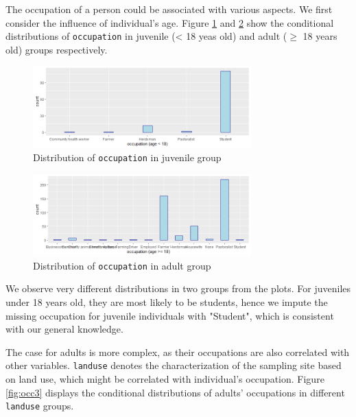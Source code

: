 \documentclass[11pt,twoside]{article}
\numberwithin{Theorem}{section}
\numberwithin{Definition}{section}
\numberwithin{Lemma}{section}
\numberwithin{Algorithm}{section}
\numberwithin{equation}{section}
\begin{document}
The occupation of a person could be associated with various aspects. We first consider the influence of individual's age. Figure \ref{fig:occ1} and \ref{fig:occ2} show the conditional distributions of \texttt{occupation} in juvenile (< 18 yeas old) and adult ($\geq$ 18 years old) groups respectively. 

\begin{figure}[!h]
	\centering
	\includegraphics[width = 0.75\textwidth]{Images/occupation_age_1.png}
	\caption{Distribution of \texttt{occupation} in juvenile group}
	\label{fig:occ1}
\end{figure}

\begin{figure}[!h]
	\centering
	\includegraphics[width = 0.75\textwidth]{Images/occupation_age_2.png}
	\caption{Distribution of \texttt{occupation} in adult group}
	\label{fig:occ2}
\end{figure}

We observe very different distributions in two groups from the plots. For juveniles under 18 years old, they are most likely to be students, hence we impute the missing occupation for juvenile individuals with "Student", which is consistent with our general knowledge.  

The case for adults is more complex, as their occupations are also correlated with other variables. \texttt{landuse} denotes the characterization of the sampling site based on land use, which might be correlated with individual's occupation. Figure \ref{fig:occ3} displays the conditional distributions of adults' occupations in different \texttt{landuse} groups.
\end{document}
